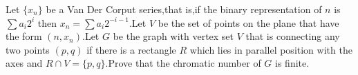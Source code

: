 Let $\{x_n\}$ be a Van Der Corput series,that is,if the binary representation of $n$ is $\sum a_{i}2^{i}$ then $x_n=\sum a_i2^{-i-1}$.Let $V$ be the set of points on the plane that have the form $(n,x_n)$.Let $G$ be the graph with vertex set $V$ that is connecting any two points $(p,q)$ if there is a rectangle $R$ which lies in parallel position with the axes and $R\cap V= \{p,q\}$.Prove that the chromatic number of $G$ is finite.